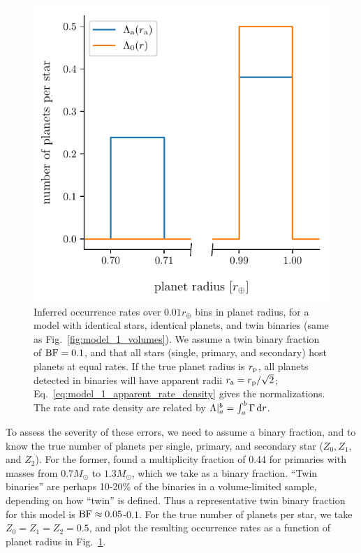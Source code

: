 \documentclass[12pt,modern]{aastex61}
\renewcommand{\a}{_{\rm a}}
\newcommand{\p}{_{\rm p}}
\begin{document}
\begin{figure}[!tb]
    \begin{center}
        \includegraphics[width=.6\textwidth]{figures/occ_rate_vs_radius_model_1_brokenx.pdf}
    \end{center}
    \vspace{-0.5cm}
    \caption{
        Inferred occurrence rates over $0.01r_\oplus$ bins in planet 
        radius, for a model with identical stars, identical planets, and twin 
        binaries (same as Fig.~\ref{fig:model_1_volumes}).
        We assume a twin binary fraction of ${\rm BF}=0.1$, and that all 
        stars (single, primary, and secondary) host planets at equal 
        rates.
        If the true planet radius is $r\p$, all planets detected in binaries 
        will have apparent radii $r\a = r\p/\sqrt{2}$;
        Eq.~\ref{eq:model_1_apparent_rate_density} gives the normalizations.
        The rate and rate density are related by $\Lambda|_a^b = 
        \int_{a}^{b}\Gamma\,{\rm d}r$.
    }
    \label{fig:occ_rate_model_1}
\end{figure}

To assess the severity of these errors, we need to assume a binary fraction, 
and to know the true number of planets per single, primary, and secondary star 
($Z_0,Z_1,$ and $Z_2$).
For the former,
\citet{raghavan_survey_2010} found a multiplicity 
fraction of 0.44 for primaries with masses from $0.7M_\odot$ to $1.3M_\odot$, 
which we take as a binary fraction. 
``Twin binaries'' are perhaps 10-20\% of the binaries in a volume-limited 
sample, depending on how ``twin'' is defined.
Thus a representative twin binary fraction for this model is ${\rm BF}\approx 
0.05$-$0.1$. 
For the true number of planets per star, we take $Z_0=Z_1=Z_2=0.5$, and plot 
the resulting occurrence rates as a function of planet radius in 
Fig.~\ref{fig:occ_rate_model_1}.
\end{document}
